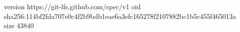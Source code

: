 version https://git-lfs.github.com/spec/v1
oid sha256:114bf2fda707e0c4f2b9bdb1eae6a3efc165278f2107882bc1b5c455f465013a
size 43840

